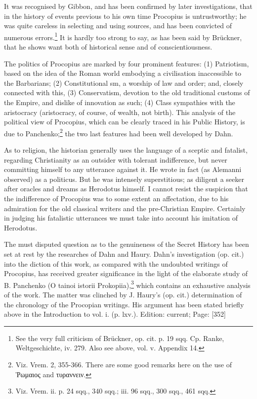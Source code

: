 It was recognised by Gibbon, and has been confirmed by later investigations, that in the history of events previous to his own time Procopius is untrustworthy; he was quite careless in selecting and using sources, and has been convicted of numerous errors.\footnote{See the very full criticism of Brückner, op. cit. p. 19 sqq. Cp. Ranke, Weltgeschichte, iv. 279. Also see above, vol. v. Appendix 14.} It is hardly too strong to say, as has been said by Brückner, that he shows want both of historical sense and of conscientiousness.

The politics of Procopius are marked by four prominent features: (1) Patriotism, based on the idea of the Roman world embodying a civilisation inaccessible to the Barbarians; (2) Constitutional sm, a worship of law and order; and, closely connected with this, (3) Conservatism, devotion to the old traditional customs of the Empire, and dislike of innovation as such; (4) Class sympathies with the aristocracy (aristocracy, of course, of wealth, not birth). This analysis of the political view of Procopius, which can be clearly traced in his Public History, is due to Panchenko;\footnote{Viz. Vrem. 2, 355-366. There are some good remarks here on the use of \textgreek{\texthebrew{Ῥ}ωμαιος} and \textgreek{τυραννειν}.} the two last features had been well developed by Dahn.

As to religion, the historian generally uses the language of a sceptic and fatalist, regarding Christianity as an outsider with tolerant indifference, but never committing himself to any utterance against it. He wrote in fact (as Alemanni observed) as a politicus. But he was intensely superstitious; as diligent a seeker after oracles and dreams as Herodotus himself. I cannot resist the suspicion that the indifference of Procopius was to some extent an affectation, due to his admiration for the old classical writers and the pre-Christian Empire. Certainly in judging his fatalistic utterances we must take into account his imitation of Herodotus.

The must disputed question as to the genuineness of the Secret History has been set at rest by the researches of Dahn and Haury. Dahn\texthebrew{}’s investigation (op. cit.) into the diction of this work, as compared with the undoubted writings of Procopius, has received greater significance in the light of the elaborate study of B. Panchenko (O tainoi istorii Prokopiia),\footnote{Viz. Vrem. ii. p. 24 sqq., 340 sqq.; iii. 96 sqq., 300 sqq., 461 sqq.} which contains an exhaustive analysis of the work. The matter was clinched by J. Haury\texthebrew{}’s (op. cit.) determination of the chronology of the Procopian writings. His argument has been stated briefly above in the Introduction to vol. i. (p. lxv.).
Edition: current; Page: [352]

